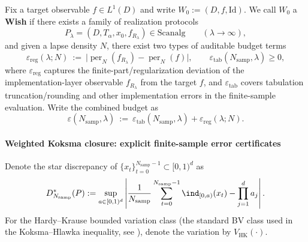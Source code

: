 \begin{definition}\label{def:op-algebra-wish}
Fix a target observable \(f\in L^1(D)\) and write \(W_0:=(D,f,\mathrm{Id})\).
We call \(W_0\) a \textbf{Wish} if there exists a family of realization protocols
\[
P_\lambda=(D,T_\alpha,x_0,f_{R_\lambda})\in\mathrm{Scanalg}\qquad(\lambda\to\infty),
\]
and given a lapse density \(N\), there exist two types of auditable budget terms
\[
\varepsilon_{\mathrm{reg}}(\lambda;N)
~:=~
\bigl|\operatorname{per}_{N}(f_{R_\lambda})-\operatorname{per}_{N}(f)\bigr|,
\qquad
\varepsilon_{\mathrm{tab}}(N_{\mathrm{samp}},\lambda)\ge 0,
\]
where \(\varepsilon_{\mathrm{reg}}\) captures the finite-part/regularization deviation of the implementation-layer observable \(f_{R_\lambda}\) from the target \(f\), and \(\varepsilon_{\mathrm{tab}}\) covers tabulation truncation/rounding and other implementation errors in the finite-sample evaluation.
Write the combined budget as
\begin{equation}\label{eq:op-algebra-wish-eps-def}
\varepsilon(N_{\mathrm{samp}},\lambda)
~:=~
\varepsilon_{\mathrm{tab}}(N_{\mathrm{samp}},\lambda)+\varepsilon_{\mathrm{reg}}(\lambda;N).
\end{equation}
\end{definition}

\paragraph{Weighted Koksma closure: explicit finite-sample error certificates}
Denote the star discrepancy of \(\{x_t\}_{t=0}^{N_{\mathrm{samp}}-1}\subset [0,1)^d\) as
\begin{equation}\label{eq:op-algebra-star-discrepancy}
D_{N_{\mathrm{samp}}}^{\ast}(P)
:=\sup_{a\in[0,1)^d}\left|
\frac{1}{N_{\mathrm{samp}}}\sum_{t=0}^{N_{\mathrm{samp}}-1}\ind_{[0,a)}(x_t)-\prod_{j=1}^{d} a_j
\right|.
\end{equation}
For the Hardy--Krause bounded variation class (the standard BV class used in the Koksma--Hlawka inequality, see \cite{KuipersNiederreiter1974}), denote the variation by \(V_{\mathrm{HK}}(\cdot)\).

